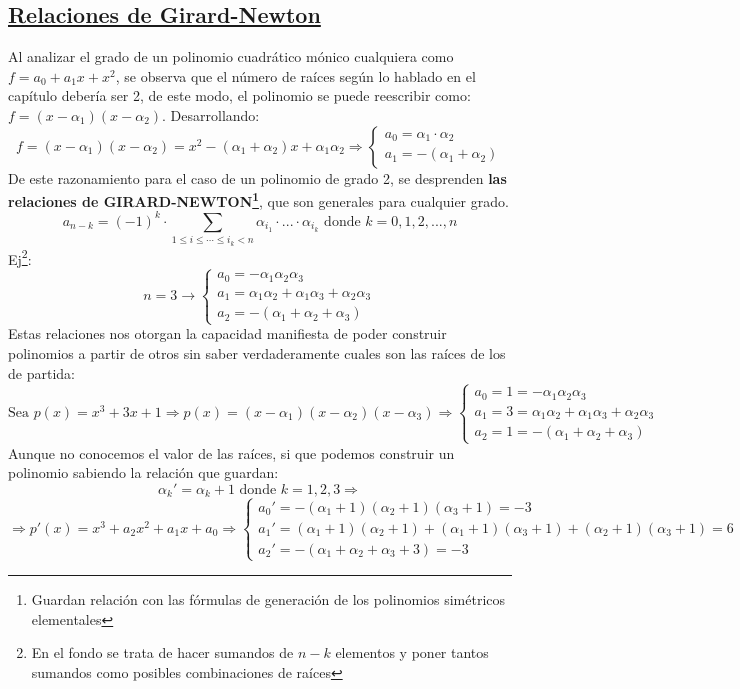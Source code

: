 \documentclass[10pt,a4paper,openright]{book}
\begin{document}
\subsection*{\underline{Relaciones de Girard-Newton}}
Al analizar el grado de un polinomio cuadrático mónico cualquiera como $f=a_0+a_1x+x^2$, se observa que el número de raíces según lo hablado en el capítulo debería ser 2, de este modo, el polinomio se puede reescribir como: $f=(x-\alpha_1)(x-\alpha_2)$. Desarrollando:
$$f=(x-\alpha_1)(x-\alpha_2)=x^2-(\alpha_1+\alpha_2)x+\alpha_1\alpha_2\Rightarrow\begin{cases}a_0=\alpha_1\cdot \alpha_2 \\
a_1=-(\alpha_1+\alpha_2)\end{cases}$$
De este razonamiento para el caso de un polinomio de grado 2, se desprenden \textbf{las relaciones de GIRARD-NEWTON\footnote{Guardan relación con las fórmulas de generación de los polinomios simétricos elementales}}, que son generales para cualquier grado.
$$a_{n-k}=(-1)^k\cdot \sum_{1\leq i\leq \cdots \leq i_k<n}\alpha_{i_1}\cdot ... \cdot \alpha_{i_k}\mbox{ donde }k=0,1,2, ..., n$$
Ej\footnote{En el fondo se trata de hacer sumandos de $n-k$ elementos y poner tantos sumandos como posibles combinaciones de raíces}:
$$n=3\rightarrow \begin{cases} a_0=-\alpha_1\alpha_2\alpha_3 \\
a_1=\alpha_1\alpha_2+ \alpha_1\alpha_3+ \alpha_2\alpha_3 \\
a_2=-(\alpha_1+\alpha_2+\alpha_3)
\end{cases}$$
Estas relaciones nos otorgan la capacidad manifiesta de poder  construir polinomios a partir de otros sin saber verdaderamente cuales son las raíces de los de partida:
$$\mbox{Sea }p(x)=x^3+3x+1\Rightarrow p(x)=(x-\alpha_1)(x-\alpha_2)(x-\alpha_3)\Rightarrow
\begin{cases}
a_0=1=-\alpha_1\alpha_2\alpha_3 \\
a_1=3=\alpha_1\alpha_2+\alpha_1\alpha_3+\alpha_2\alpha_3 \\
a_2=1=-(\alpha_1+\alpha_2+\alpha_3)
\end{cases}$$
Aunque no conocemos el valor de las raíces, si que podemos construir un polinomio sabiendo la relación que guardan:
$$\alpha_k'=\alpha_k+1\mbox{ donde }k=1,2,3\Rightarrow$$
$$\Rightarrow p'(x)=x^3+a_2x^2+a_1x+a_0\Rightarrow
\begin{cases}
a_0'=-(\alpha_1+1)(\alpha_2+1)(\alpha_3+1)=-3 \\
a_1'=(\alpha_1+1)(\alpha_2+1)+(\alpha_1+1)(\alpha_3+1)+(\alpha_2+1)(\alpha_3+1)=6 \\
a_2'=-(\alpha_1+\alpha_2+\alpha_3+3)=-3
\end{cases}$$
\end{document}
